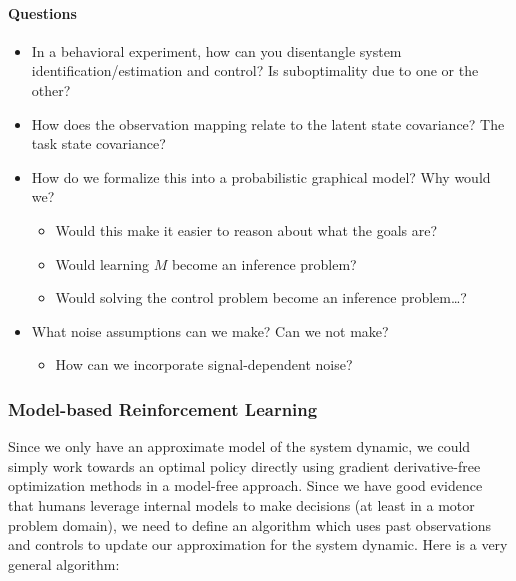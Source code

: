 \documentclass[
  a4paper,
]{article}
\providecommand{\tightlist}{%
  \setlength{\itemsep}{0pt}\setlength{\parskip}{0pt}}
\begin{document}
\hypertarget{questions}{%
\paragraph{Questions}\label{questions}}

\begin{itemize}
\tightlist
\item
  In a behavioral experiment, how can you disentangle system
  identification/estimation and control? Is suboptimality due to one or
  the other?
\item
  How does the observation mapping relate to the latent state
  covariance? The task state covariance?
\item
  How do we formalize this into a probabilistic graphical model? Why
  would we?

  \begin{itemize}
  \tightlist
  \item
    Would this make it easier to reason about what the goals are?
  \item
    Would learning \(M\) become an inference problem?
  \item
    Would solving the control problem become an inference problem\ldots?
  \end{itemize}
\item
  What noise assumptions can we make? Can we not make?

  \begin{itemize}
  \tightlist
  \item
    How can we incorporate signal-dependent noise?
  \end{itemize}
\end{itemize}

\hypertarget{model-based-reinforcement-learning}{%
\subsubsection{Model-based Reinforcement
Learning}\label{model-based-reinforcement-learning}}

Since we only have an approximate model of the system dynamic, we could
simply work towards an optimal policy directly using gradient
derivative-free optimization methods in a model-free approach. Since we
have good evidence that humans leverage internal models to make
decisions (at least in a motor problem domain), we need to define an
algorithm which uses past observations and controls to update our
approximation for the system dynamic. Here is a very general algorithm:
\end{document}
